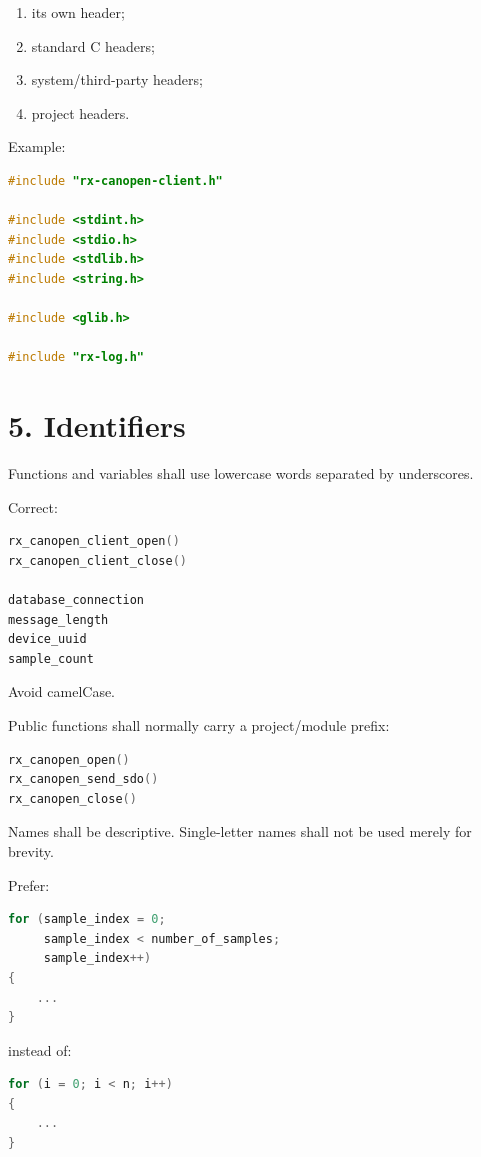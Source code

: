\documentclass[11pt,a4paper]{article}
\begin{document}
\begin{enumerate}
\def\labelenumi{\arabic{enumi}.}
\tightlist
\item
  its own header;
\item
  standard C headers;
\item
  system/third-party headers;
\item
  project headers.
\end{enumerate}

Example:

\begin{lstlisting}[language=C]
#include "rx-canopen-client.h"

#include <stdint.h>
#include <stdio.h>
#include <stdlib.h>
#include <string.h>

#include <glib.h>

#include "rx-log.h"
\end{lstlisting}

\section{5. Identifiers}\label{5-identifiers}

Functions and variables shall use lowercase words separated by
underscores.

Correct:

\begin{lstlisting}[language=C]
rx_canopen_client_open()
rx_canopen_client_close()

database_connection
message_length
device_uuid
sample_count
\end{lstlisting}

Avoid camelCase.

Public functions shall normally carry a project/module prefix:

\begin{lstlisting}[language=C]
rx_canopen_open()
rx_canopen_send_sdo()
rx_canopen_close()
\end{lstlisting}

Names shall be descriptive. Single-letter names shall not be used merely
for brevity.

Prefer:

\begin{lstlisting}[language=C]
for (sample_index = 0;
     sample_index < number_of_samples;
     sample_index++)
{
    ...
}
\end{lstlisting}

instead of:

\begin{lstlisting}[language=C]
for (i = 0; i < n; i++)
{
    ...
}
\end{lstlisting}
\end{document}
